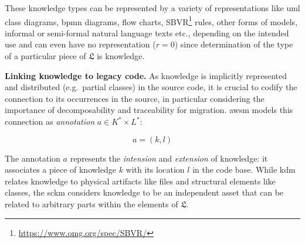 
These knowledge types can be represented by a variety of representations like \gls{uml} class diagrams, \gls{bpmn} diagrams, flow charts, SBVR\footnote{\url{https://www.omg.org/spec/SBVR/}} rules, other forms of models, informal or semi-formal natural language texts etc., depending on the intended use and can even have no representation (\(r=0\)) since determination of the type of a particular piece of \(\mathfrak{L}\) is knowledge.

\textbf{Linking knowledge to legacy code.} As knowledge is implicitly represented and distributed (e.g.~partial classes) in the source code, it is crucial to codify the connection to its occurrences in the source, in particular considering the importance of decomposability and traceability for migration.
\gls{awsm} models this connection as \emph{annotation} \(a \in K^* \times L^*\):

\begin{equation}a = (k, l)\label{eq:annotation}\end{equation}

The annotation \(a\) represents the \emph{intension} and \emph{extension} \autocite{Chen2010FeatureLocation} of knowledge: it associates a piece of knowledge \(k\) with its location \(l\) in the  code base.
While \gls{kdm} relates knowledge to physical \glspl{artifact} like files and structural elements like classes, the \gls{sckm} considers knowledge to be an independent \gls{asset} that can be related to arbitrary parts within the elements of \(\mathfrak{L}\).

